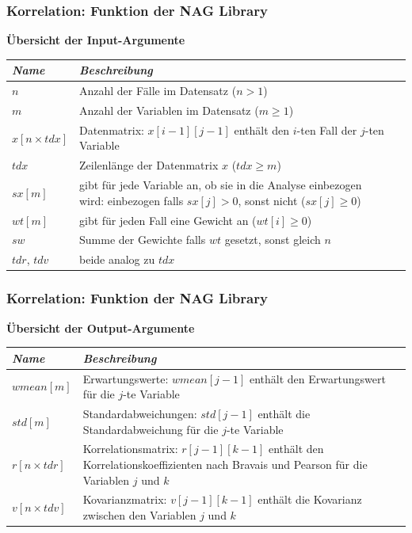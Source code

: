 \documentclass{beamer}
\begin{document}
\begin{frame}
	\frametitle{Korrelation: Funktion der NAG Library}
	
	\par \textbf{Übersicht der Input-Argumente}\\[3mm]
	
	\begin{tabular}[ht]{|l|p{9cm}l|}
  	\hline
  	\textit{Name} & \textit{Beschreibung}\\
  	\hline \hline
  	$n$ & Anzahl der Fälle im Datensatz ($n > 1$)\\ \hline
  	$m$ & Anzahl der Variablen im Datensatz ($m \geq 1$)\\ \hline
        $x[n \times tdx]$ & Datenmatrix: $x[i - 1][j - 1]$ enthält \newline
        den $i$-ten Fall der $j$-ten Variable\\ \hline
        $tdx$ & Zeilenlänge der Datenmatrix $x$ ($tdx \geq m$)\\ \hline
        $sx[m]$ & gibt für jede Variable an, ob sie in die Analyse einbezogen wird: einbezogen falls $sx[j] > 0$, sonst nicht ($sx[j] \geq 0$)\\ \hline
        $wt[m]$ & gibt für jeden Fall eine Gewicht an ($wt[i] \geq 0$)\\ \hline
        $sw$ & Summe der Gewichte falls $wt$ gesetzt, sonst gleich $n$\\ \hline
        $tdr$, $tdv$ & beide analog zu $tdx$\\
  	\hline
	\end{tabular}
\end{frame}

\begin{frame}
	\frametitle{Korrelation: Funktion der NAG Library}
	
	\par \textbf{Übersicht der Output-Argumente}\\[3mm]
	
	\begin{tabular}[ht]{|l|p{9cm}l|}
  	\hline
  	\textit{Name} & \textit{Beschreibung}\\
  	\hline \hline
  	$wmean[m]$ & Erwartungswerte: $wmean[j - 1]$ enthält \newline
  	den Erwartungswert für die $j$-te Variable\\ \hline
  	$std[m]$ & Standardabweichungen: $std[j - 1]$ enthält \newline
  	die Standardabweichung für die $j$-te Variable\\ \hline
		$r[n \times tdr]$ & Korrelationsmatrix: $r[j - 1][k - 1]$ enthält \newline
		den Korrelationskoeffizienten nach Bravais \newline
		und Pearson für die Variablen $j$ und $k$\\ \hline
		$v[n \times tdv]$ & Kovarianzmatrix: $v[j - 1][k - 1]$ enthält \newline
		die Kovarianz zwischen den Variablen $j$ und $k$\\
  	\hline
	\end{tabular}
\end{frame}
\end{document}
